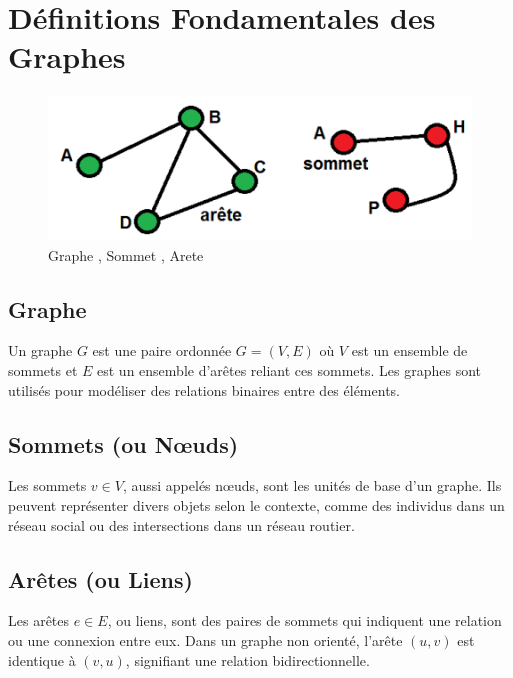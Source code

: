 \section{Définitions Fondamentales des Graphes}



\begin{figure}[H]
    \centering
    \includegraphics{Assets/graphes.PNG}
    \caption{Graphe , Sommet , Arete}
    \label{fig:enter-label}
\end{figure}
\subsection{Graphe}
Un graphe \( G \) est une paire ordonnée \( G = (V, E) \) où \( V \) est un ensemble de sommets et \( E \) est un ensemble d'arêtes reliant ces sommets. Les graphes sont utilisés pour modéliser des relations binaires entre des éléments.

\subsection{Sommets (ou Nœuds)}
Les sommets \( v \in V \), aussi appelés nœuds, sont les unités de base d'un graphe. Ils peuvent représenter divers objets selon le contexte, comme des individus dans un réseau social ou des intersections dans un réseau routier.

\subsection{Arêtes (ou Liens)}
Les arêtes \( e \in E \), ou liens, sont des paires de sommets qui indiquent une relation ou une connexion entre eux. Dans un graphe non orienté, l'arête \( (u, v) \) est identique à \( (v, u) \), signifiant une relation bidirectionnelle.



